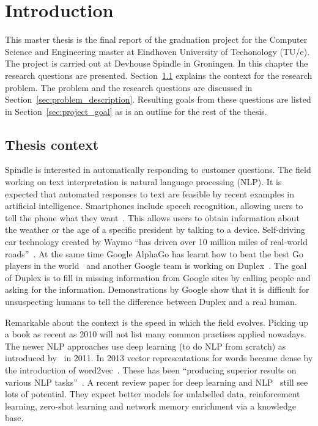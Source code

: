 \chapter{Introduction}
\label{ch:introduction}

\setcounter{page}{0}
This master thesis is the final report of the graduation project for the Computer Science and Engineering master at Eindhoven University of Techonology (TU/e).
The project is carried out at Devhouse Spindle in Groningen.
In this chapter the research questions are presented.
Section~\ref{sec:thesis_context} explains the context for the research problem.
The problem and the research questions are discussed in Section~\ref{sec:problem_description}.
Resulting goals from these questions are listed in Section~\ref{sec:project_goal} as is an outline for the rest of the thesis.

\section{Thesis context}
\label{sec:thesis_context}
Spindle is interested in automatically responding to customer questions.
The field working on text interpretation is natural language processing (NLP).
It is expected that automated responses to text are feasible by recent examples in artificial intelligence.
Smartphones include speech recognition, allowing users to tell the phone what they want~\citep{lopez2017alexa}.
This allows users to obtain information about the weather or the age of a specific president by talking to a device.
Self-driving car technology created by Waymo ``has driven over 10 million miles of real-world roads''~\citep{waymo2018}.
At the same time Google AlphaGo has learnt how to beat the best Go players in the world~\citep{gibney2016google} and another Google team is working on Duplex~\citep{leviathan2018google}.
The goal of Duplex is to fill in missing information from Google sites by calling people and asking for the information.
Demonstrations by Google show that it is difficult for unsuspecting humans to tell the difference between Duplex and a real human.

Remarkable about the context is the speed in which the field evolves.
Picking up a book as recent as 2010 will not list many common practises applied nowadays.
The newer NLP approaches use deep learning (to do NLP from scratch) as introduced by~\citet{collobert2011natural} in 2011.
In 2013 vector representations for words became dense by the introduction of word2vec~\citep{mikolov2013distributed}.
These has been ``producing superior results on various NLP tasks''~\citep{young2018recent}.
A recent review paper for deep learning and NLP~\citep{young2018recent} still see lots of potential.
They expect better models for unlabelled data, reinforcement learning, zero-shot learning and network memory enrichment via a knowledge base.

